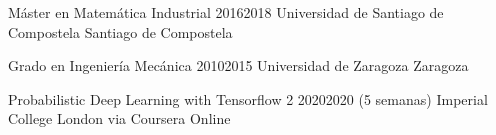 \cvitem
    {Máster en Matemática Industrial} %
    {2016}{2018} %
    {Universidad de Santiago de Compostela} %
    {Santiago de Compostela} %

\vspace{10pt}
\cvitem
    {Grado en Ingeniería Mecánica} %
    {2010}{2015} %
    {Universidad de Zaragoza} %
    {Zaragoza} %

\vspace{12pt}
\cvitem
    {Probabilistic Deep Learning with Tensorflow 2} %
    {2020}{2020 (5 semanas)} %
    {Imperial College London via Coursera} %
    {Online} %